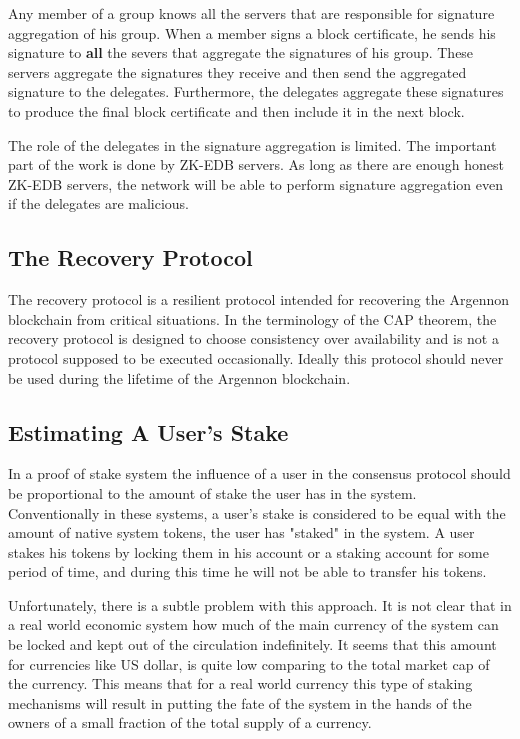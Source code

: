 Any member of a group knows all the servers that are responsible for signature aggregation of his group. When a member
signs a block certificate, he sends his signature to \textbf{all} the severs that aggregate the signatures of his group.
These servers aggregate the signatures they receive and then send the aggregated signature to the delegates.
Furthermore, the delegates aggregate these signatures to produce the final block certificate
and then include it in the next block.

The role of the delegates in the signature aggregation is limited. The important part of the work is done by ZK-EDB
servers. As long as there are enough honest ZK-EDB servers, the network will be able to perform signature aggregation
even if the delegates are malicious.

\subsection{The Recovery Protocol}\label{subsec:recovery}

The recovery protocol is a resilient protocol intended for recovering the Argennon blockchain from critical situations.
In the terminology of the CAP theorem, the recovery protocol is designed to choose consistency over availability
and is not a protocol supposed to be executed occasionally. Ideally this protocol should never be used
during the lifetime of the Argennon blockchain.

\subsection{Estimating A User's Stake}\label{subsec:user's-stake}

In a proof of stake system the influence of a user in the consensus protocol should be proportional to the amount
of stake the user has in the system. Conventionally in these systems, a user's stake is considered to be equal with the
amount of native system tokens, the user has "staked" in the system. A user stakes his tokens by locking them in
his account or a staking account for some period of time, and during this time he will not be able to transfer
his tokens.

Unfortunately, there is a subtle problem with this approach. It is not clear that in a real world economic system
how much of the main currency of the system can be locked and kept out of the circulation indefinitely. It seems that
this amount for currencies like US dollar, is quite low comparing to the total market cap of the currency.
This means that for a real world currency this type of staking mechanisms will result in putting the
fate of the system in the hands of the owners of a small fraction of the total supply of a currency.

